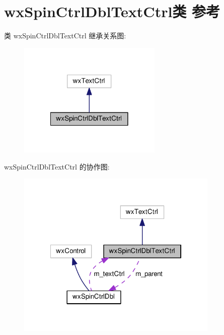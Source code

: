 \hypertarget{classwx_spin_ctrl_dbl_text_ctrl}{\section{wx\+Spin\+Ctrl\+Dbl\+Text\+Ctrl类 参考}
\label{classwx_spin_ctrl_dbl_text_ctrl}
}


类 wx\+Spin\+Ctrl\+Dbl\+Text\+Ctrl 继承关系图\+:
\nopagebreak
\begin{figure}[H]
\begin{center}
\leavevmode
\includegraphics[width=194pt]{classwx_spin_ctrl_dbl_text_ctrl__inherit__graph}
\end{center}
\end{figure}


wx\+Spin\+Ctrl\+Dbl\+Text\+Ctrl 的协作图\+:
\nopagebreak
\begin{figure}[H]
\begin{center}
\leavevmode
\includegraphics[width=273pt]{classwx_spin_ctrl_dbl_text_ctrl__coll__graph}
\end{center}
\end{figure}
